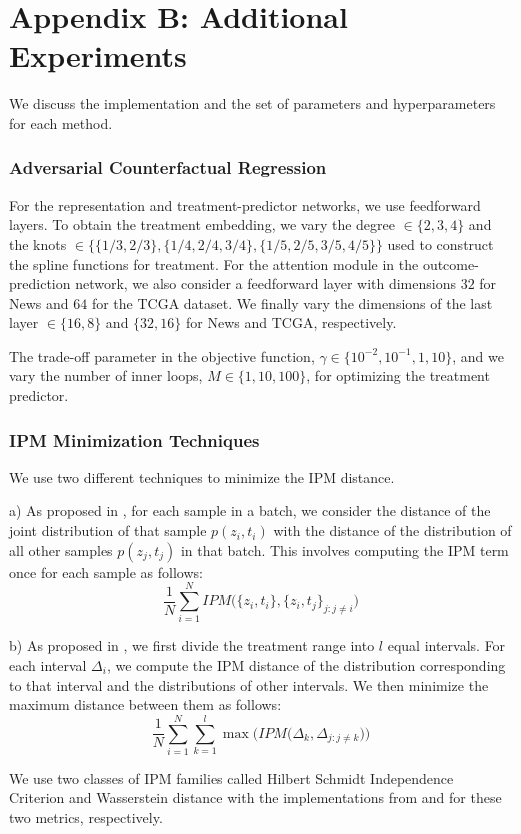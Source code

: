 \documentclass[letterpaper]{article} %
\begin{document}
\section*{Appendix B: Additional Experiments}
We discuss the implementation and the set of parameters and hyperparameters for each method.
\subsubsection{Adversarial Counterfactual Regression}
For the representation and treatment-predictor networks, we use feedforward layers. To obtain the treatment embedding, we vary the degree $\in \{2, 3, 4\}$ and the knots $\in \{\{1/3, 2/3\}, \{1/4, 2/4, 3/4\}, \{1/5, 2/5, 3/5, 4/5\}\}$ used to construct the spline functions for treatment. For the attention module in the outcome-prediction network, we also consider a feedforward layer with dimensions $32$ for News and $64$ for the TCGA dataset. We finally vary the dimensions of the last layer $\in \{16, 8\}$ and $\{32, 16\}$ for News and TCGA, respectively.

The trade-off parameter in the objective function, $\gamma \in \{10^{-2}, 10^{-1}, 1, 10\}$, and we vary the number of inner loops, $M \in \{1, 10, 100\}$, for optimizing the treatment predictor.

\subsubsection{IPM Minimization Techniques}
We use two different techniques to minimize the IPM distance.

a) As proposed in \cite{bellot2022generalization}, for each sample in a batch, we consider the distance of the joint distribution of that sample $p(z_i, t_i)$ with the distance of the distribution of all other samples $p(z_j, t_j)$ in that batch. This involves computing the IPM term once for each sample as follows:
\[
\frac{1}{N} \sum_{i=1}^N IPM \Big(\{z_i, t_i\}, \{z_i, t_j\}_{j: j \neq i}\Big)
\]

b) As proposed in \cite{wang2022generalization}, we first divide the treatment range into $l$ equal intervals. For each interval $\Delta_i$, we compute the IPM distance of the distribution corresponding to that interval and the distributions of other intervals. We then minimize the maximum distance between them as follows:
\[
\frac{1}{N} \sum_{i=1}^N \sum_{k=1}^l \max \Big( IPM \big( \Delta_k, \Delta_{j: j\neq k} \big) \Big)
\]

We use two classes of IPM families called Hilbert Schmidt Independence Criterion and Wasserstein distance with the implementations from \cite{bellot2022generalization} and \cite{shalit2017estimating} for these two metrics, respectively.
\end{document}
